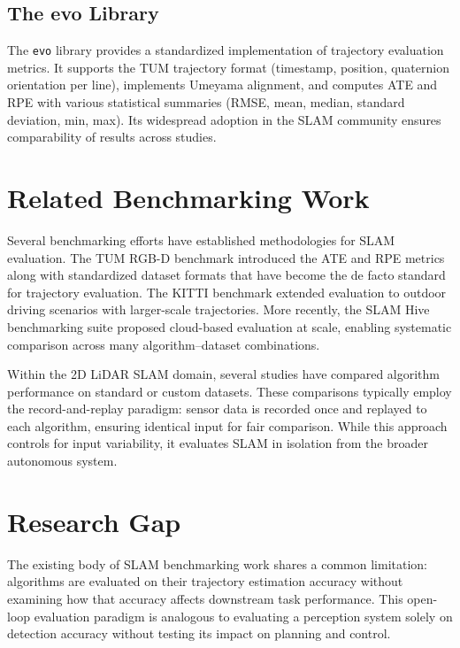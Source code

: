 \subsection{The evo Library}

The \texttt{evo} library \citep{grupp2017evo} provides a standardized implementation of trajectory evaluation metrics. It supports the TUM trajectory format (timestamp, position, quaternion orientation per line), implements Umeyama alignment, and computes ATE and RPE with various statistical summaries (RMSE, mean, median, standard deviation, min, max). Its widespread adoption in the SLAM community ensures comparability of results across studies.

\section{Related Benchmarking Work}

Several benchmarking efforts have established methodologies for SLAM evaluation. The TUM RGB-D benchmark \citep{sturm2012benchmark} introduced the ATE and RPE metrics along with standardized dataset formats that have become the de facto standard for trajectory evaluation. The KITTI benchmark \citep{geiger2013kitti} extended evaluation to outdoor driving scenarios with larger-scale trajectories. More recently, the SLAM Hive benchmarking suite \citep{wisth2024slamhive} proposed cloud-based evaluation at scale, enabling systematic comparison across many algorithm--dataset combinations.

Within the 2D LiDAR SLAM domain, several studies have compared algorithm performance on standard or custom datasets. These comparisons typically employ the record-and-replay paradigm: sensor data is recorded once and replayed to each algorithm, ensuring identical input for fair comparison. While this approach controls for input variability, it evaluates SLAM in isolation from the broader autonomous system.

\section{Research Gap}

The existing body of SLAM benchmarking work shares a common limitation: algorithms are evaluated on their trajectory estimation accuracy without examining how that accuracy affects downstream task performance. This open-loop evaluation paradigm is analogous to evaluating a perception system solely on detection accuracy without testing its impact on planning and control.

